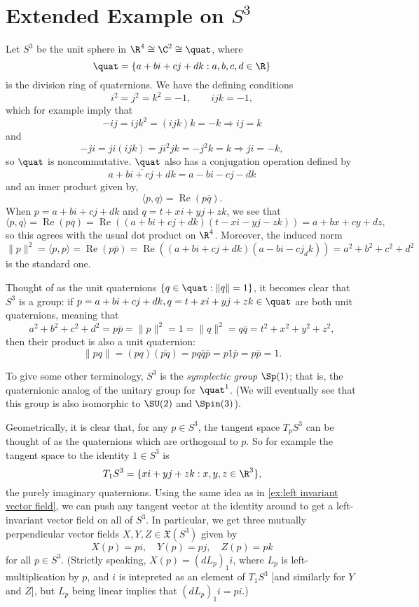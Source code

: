 
\section{Extended Example on $S^3$}

Let $S^3$ be the unit sphere in $\R^4 \cong \C^2 \cong \quat$, where 
\[
	\quat = \{ a + bi + cj + dk : a,b,c,d\in \R\}
\]
is the division ring of quaternions. We have the defining conditions
\[
	i^2=j^2=k^2 = -1, \qquad ijk = -1,
\]
which for example imply that 
\[
	-ij = ijk^2 = (ijk)k = -k \Rightarrow ij=k
\]
and
\[
	-ji = ji(ijk) = ji^2jk = -j^2k = k \Rightarrow ji = -k,
\]
so $\quat$ is noncommutative. $\quat$ also has a conjugation operation defined by 
\[
	\overline{a+bi+cj+dk} = a-bi-cj-dk
\]
and an inner product given by,
\[
	\langle p,q \rangle = \operatorname{Re}(p\overline{q}).
\]
When $p = a+bi+cj+dk$ and $q = t + xi + yj + zk$, we see that
\[
	\langle p , q \rangle = \operatorname{Re}(p\overline{q}) = \operatorname{Re}((a+bi+cj+dk)(t-xi-yj-zk)) = a+bx+cy+dz,
\]
so this agrees with the usual dot product on $\R^4$. Moreover, the induced norm
\[
	\|p\|^2 = \langle p, p\rangle = \operatorname{Re}(p \overline{p}) = \operatorname{Re}((a+bi+cj+dk) (a-bi-cj_dk)) = a^2 + b^2 + c^2 + d^2
\]
is the standard one.

Thought of as the unit quaternions $\{q \in \quat : \|q\| = 1\}$, it becomes clear that $S^3$ is a group: if $p = a+bi+cj+dk , q = t + xi + yj + zk \in \quat$ are both unit quaternions, meaning that
\[
	a^2 + b^2 + c^2 + d^2 = p \overline{p} = \|p\|^2 = 1 = \|q\|^2 = q \overline{q} = t^2 + x^2 + y^2 + z^2,
\]
then their product is also a unit quaternion:
\[
	\|pq\| = (pq)(\overline{pq}) = p q \overline{q} \overline{p} = p 1 \overline{p} = p \overline{p} = 1.
\]

To give some other terminology, $S^3$ is the \emph{symplectic group} $\Sp(1)$; that is, the quaternionic analog of the unitary group for $\quat^1$. (We will eventually see that this group is also isomorphic to $\SU(2)$ and $\Spin(3)$).

Geometrically, it is clear that, for any $p \in S^3$, the tangent space $T_pS^3$ can be thought of as the quaternions which are orthogonal to $p$. So for example the tangent space to the identity $1 \in S^3$ is
\[
	T_1 S^3 = \{xi + yj + zk : x,y,z \in \R^3\},
\]
the purely imaginary quaternions. Using the same idea as in \cref{ex:left invariant vector field}, we can push any tangent vector at the identity around to get a left-invariant vector field on all of $S^3$. In particular, we get three mutually perpendicular vector fields $X,Y,Z \in \mathfrak{X}(S^3)$ given by
\[
	X(p) = pi, \quad Y(p) = pj, \quad Z(p) = pk
\]
for all $p \in S^3$. (Strictly speaking, $X(p) = (d L_p)_1 i$, where $L_p$ is left-multiplication by $p$, and $i$ is intepreted as an element of $T_1S^3$ [and similarly for $Y$ and $Z$], but $L_p$ being linear implies that $(dL_p)_1 i = pi$.)

